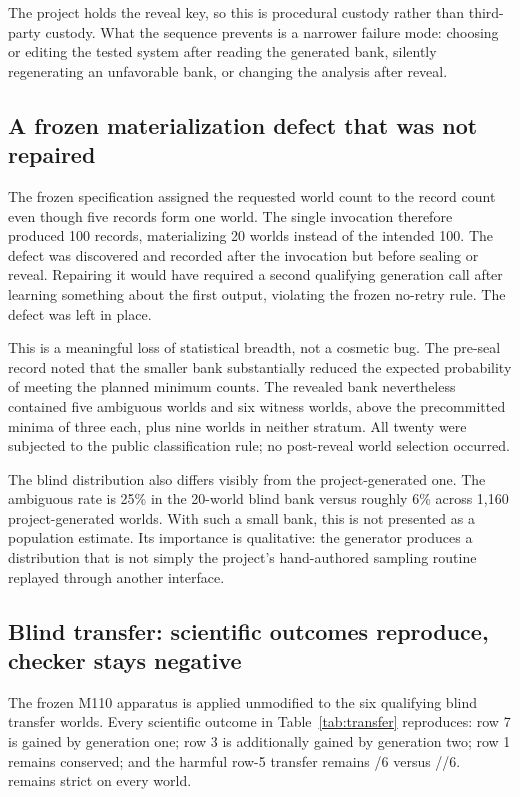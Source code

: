 The project holds the reveal key, so this is procedural custody rather than third-party custody. What the sequence prevents is a narrower failure mode: choosing or editing the tested system after reading the generated bank, silently regenerating an unfavorable bank, or changing the analysis after reveal.

\subsection{A frozen materialization defect that was not repaired}
The frozen specification assigned the requested world count to the record count even though five records form one world. The single invocation therefore produced 100 records, materializing 20 worlds instead of the intended 100. The defect was discovered and recorded after the invocation but before sealing or reveal. Repairing it would have required a second qualifying generation call after learning something about the first output, violating the frozen no-retry rule. The defect was left in place.

This is a meaningful loss of statistical breadth, not a cosmetic bug. The pre-seal record noted that the smaller bank substantially reduced the expected probability of meeting the planned minimum counts. The revealed bank nevertheless contained five ambiguous worlds and six witness worlds, above the precommitted minima of three each, plus nine worlds in neither stratum. All twenty were subjected to the public classification rule; no post-reveal world selection occurred.

The blind distribution also differs visibly from the project-generated one. The ambiguous rate is 25\% in the 20-world blind bank versus roughly 6\% across 1,160 project-generated worlds. With such a small bank, this is not presented as a population estimate. Its importance is qualitative: the generator produces a distribution that is not simply the project's hand-authored sampling routine replayed through another interface.

\subsection{Blind transfer: scientific outcomes reproduce, checker stays negative}
The frozen M110 apparatus is applied unmodified to the six qualifying blind transfer worlds. Every scientific outcome in Table~\ref{tab:transfer} reproduces: row 7 is gained by generation one; row 3 is additionally gained by generation two; row 1 remains conserved; and the harmful row-5 transfer remains /6 versus \mone//6. \reach remains strict on every world.

